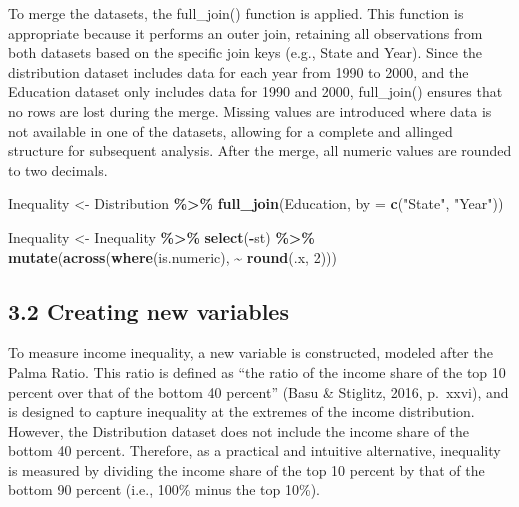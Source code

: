 \documentclass[
]{article}
\newenvironment{Shaded}{\begin{snugshade}}{\end{snugshade}}
\newcommand{\AttributeTok}[1]{\textcolor[rgb]{0.13,0.29,0.53}{#1}}
\newcommand{\DecValTok}[1]{\textcolor[rgb]{0.00,0.00,0.81}{#1}}
\newcommand{\FunctionTok}[1]{\textcolor[rgb]{0.13,0.29,0.53}{\textbf{#1}}}
\newcommand{\NormalTok}[1]{#1}
\newcommand{\OtherTok}[1]{\textcolor[rgb]{0.56,0.35,0.01}{#1}}
\newcommand{\SpecialCharTok}[1]{\textcolor[rgb]{0.81,0.36,0.00}{\textbf{#1}}}
\newcommand{\StringTok}[1]{\textcolor[rgb]{0.31,0.60,0.02}{#1}}
\begin{document}
To merge the datasets, the full\_join() function is applied. This
function is appropriate because it performs an outer join, retaining all
observations from both datasets based on the specific join keys (e.g.,
State and Year). Since the distribution dataset includes data for each
year from 1990 to 2000, and the Education dataset only includes data for
1990 and 2000, full\_join() ensures that no rows are lost during the
merge. Missing values are introduced where data is not available in one
of the datasets, allowing for a complete and allinged structure for
subsequent analysis. After the merge, all numeric values are rounded to
two decimals.

\begin{Shaded}
\begin{Highlighting}[]
\NormalTok{Inequality }\OtherTok{\textless{}{-}}\NormalTok{ Distribution }\SpecialCharTok{\%\textgreater{}\%}
  \FunctionTok{full\_join}\NormalTok{(Education, }\AttributeTok{by =} \FunctionTok{c}\NormalTok{(}\StringTok{"State"}\NormalTok{, }\StringTok{"Year"}\NormalTok{))}

\NormalTok{Inequality }\OtherTok{\textless{}{-}}\NormalTok{ Inequality }\SpecialCharTok{\%\textgreater{}\%}
  \FunctionTok{select}\NormalTok{(}\SpecialCharTok{{-}}\NormalTok{st) }\SpecialCharTok{\%\textgreater{}\%}
  \FunctionTok{mutate}\NormalTok{(}\FunctionTok{across}\NormalTok{(}\FunctionTok{where}\NormalTok{(is.numeric), }\SpecialCharTok{\textasciitilde{}} \FunctionTok{round}\NormalTok{(.x, }\DecValTok{2}\NormalTok{)))}
\end{Highlighting}
\end{Shaded}

\subsection{3.2 Creating new variables}\label{creating-new-variables}

To measure income inequality, a new variable is constructed, modeled
after the Palma Ratio. This ratio is defined as ``the ratio of the
income share of the top 10 percent over that of the bottom 40 percent''
(Basu \& Stiglitz, 2016, p.~xxvi), and is designed to capture inequality
at the extremes of the income distribution. However, the Distribution
dataset does not include the income share of the bottom 40 percent.
Therefore, as a practical and intuitive alternative, inequality is
measured by dividing the income share of the top 10 percent by that of
the bottom 90 percent (i.e., 100\% minus the top 10\%).
\end{document}
